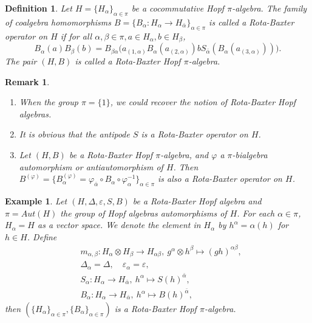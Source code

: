 \documentclass[11pt]{article}
\def\a{\alpha}
\def\b{\beta}
\def\o{\otimes}
\def\v{\varepsilon}
\newtheorem{definition}[theorem]{Definition}
\newtheorem{example}[theorem]{Example}
\newtheorem{remark}[theorem]{Remark}
\begin{document}
\begin{definition}
Let $H=\{H_\a\}_{\a\in\pi}$ be a cocommutative Hopf $\pi$-algebra. The family of coalgebra homomorphisms $B=\{B_\a:H_\a\rightarrow H_{\bar{\a}}\}_{\a\in\pi}$ is called a Rota-Baxter operator on $H$ if for all $\a,\b\in\pi, a\in H_\a,b\in H_\b$,
\begin{equation} \label{eq:RBO}
  B_\a(a)B_\b(b)=B_{\b\a}\big(a_{(1,\a)}B_\a(a_{(2,\a)})bS_{\bar{\a}}(B_\a(a_{(3,\a)}))\big).
\end{equation}
The pair $(H,B)$ is called a Rota-Baxter Hopf $\pi$-algebra.
\end{definition}

\begin{remark}
\begin{enumerate}[\rm(1)]
  \item When the group $\pi=\{1\}$, we could recover the notion of Rota-Baxter Hopf algebras.
  \item It is obvious that the antipode $S$ is a Rota-Baxter operator on $H$.
  \item Let $(H,B)$ be a Rota-Baxter Hopf $\pi$-algebra, and $\varphi$ a $\pi$-bialgebra automorphism or antiautomorphism of $H$. Then $B^{(\varphi)}=\{B^{(\varphi)}_\a=\varphi_{\bar{\a}}\circ B_\a\circ\varphi^{-1}_\a\}_{\a\in\pi}$ is also a  Rota-Baxter operator on $H$.
\end{enumerate}
\end{remark}

\begin{example}
Let $(H,\Delta,\v,S,B)$ be a Rota-Baxter Hopf algebra and $\pi=Aut(H)$ the group of Hopf algebras automorphisms of $H$. For each $\a\in\pi$, $H_\a=H$ as a vector space. We denote the element in $H_\a$ by $h^\a=\a(h)$ for $h\in H$. Define
\begin{align*}
&m_{\a,\b}:H_\a\o H_\b\rightarrow H_{\a\b},\ g^\a\o h^\b\mapsto (gh)^{\a\b},\\
&\Delta_\a=\Delta,\quad \varepsilon_\a=\varepsilon,\\
&S_\a:H_\a\rightarrow H_{\bar{\a}},\ h^\a\mapsto S(h)^{\bar{\a}},\\
&B_\a:H_\a\rightarrow H_{\bar{\a}},\ h^\a\mapsto B(h)^{\bar{\a}},
\end{align*}
then $(\{H_\a\}_{\a\in \pi},\{B_\a\}_{\a\in \pi})$ is a Rota-Baxter Hopf $\pi$-algebra.
\end{example}
\end{document}
